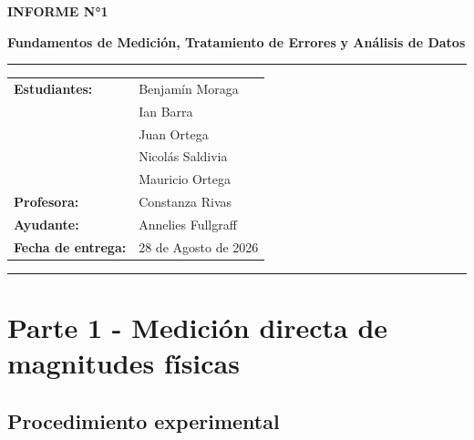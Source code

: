 \documentclass[12pt,a4paper]{article}
\begin{document}
\begin{center}
{\Large\textbf{INFORME N°1}}

{\LARGE\textbf{Fundamentos de Medición, Tratamiento de Errores}}
{\LARGE\textbf{y Análisis de Datos}}

\rule{\textwidth}{0.5pt}

\begin{tabular}{ll}
    \textbf{Estudiantes:} & Benjamín Moraga \\
                          & Ian Barra \\
                          & Juan Ortega \\
                          & Nicolás Saldivia \\
                          & Mauricio Ortega \\ [0.2cm] 
    \textbf{Profesora:}   & Constanza Rivas \\
    \textbf{Ayudante:}    & Annelies Fullgraff \\[0.2cm]
    \textbf{Fecha de entrega:} & 28 de Agosto de 2026
\end{tabular}

\vspace{0.4cm}
\rule{\textwidth}{0.5pt}

\end{center}

\section{Parte 1 - Medición directa de magnitudes físicas} \label{Parte-1}

\subsection{Procedimiento experimental} \label{Procedimiento-Parte-1}
\end{document}
